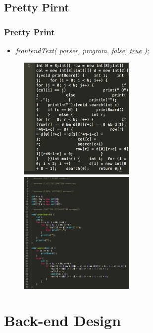 \documentclass{beamer}
\begin{document}
\subsection{Pretty Pirnt}
\begin{frame}\frametitle{Pretty Print}
	\begin{itemize}
		\item \textit{frontendText( parser, program, false, \underline{true} );}
	\end{itemize} 
	\begin{figure}
		\centering
		\includegraphics[width = 0.499\textwidth]{pp_1}
		\includegraphics[width = 0.5\textwidth]{pp_2}
	\end{figure}
\end{frame}

\section{Back-end Design}
\end{document}
